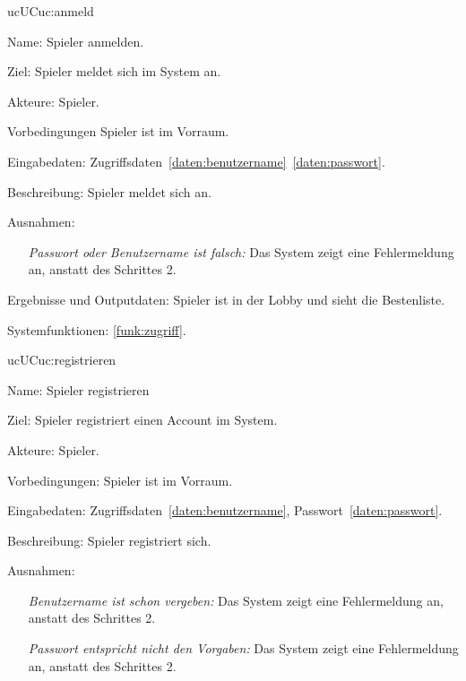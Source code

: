 \begin{description}[leftmargin=5em, style=sameline]
	
	\begin{lhp}{uc}{UC}{uc:anmeld}
		\item [Name:] Spieler anmelden.
		\item [Ziel:] Spieler meldet sich im System an.
		\item [Akteure:] Spieler.
		\item [Vorbedingungen] Spieler ist im Vorraum.
		\item [Eingabedaten:] Zugriffsdaten~\ref{daten:benutzername}~\ref{daten:passwort}.
		\item [Beschreibung:] Spieler meldet sich an.							
		\item [Ausnahmen:] \hfill
			\begin{itemize} 
				\item[] \textit{Passwort oder Benutzername ist falsch:} Das System zeigt eine Fehlermeldung an, anstatt des Schrittes 2.
				
			\end{itemize}
		\item [Ergebnisse und Outputdaten:] Spieler ist in der Lobby und sieht die Bestenliste.	
		\item [Systemfunktionen:] \ref{funk:zugriff}.
	\end{lhp}
	
	\begin{lhp}{uc}{UC}{uc:registrieren}
		\item [Name:] Spieler registrieren
		\item [Ziel:] Spieler registriert einen Account im System.
		\item [Akteure:] Spieler.
		\item [Vorbedingungen:] Spieler ist im Vorraum.
		\item [Eingabedaten:] Zugriffsdaten~\ref{daten:benutzername}, Passwort~\ref{daten:passwort}.
		\item [Beschreibung:] Spieler registriert sich.
		\item [Ausnahmen:] \hfill
			\begin{itemize} 
				\item[] \textit{Benutzername ist schon vergeben:} Das System zeigt eine Fehlermeldung an, anstatt des Schrittes 2.
				
				\item[] \textit{Passwort entspricht nicht den Vorgaben:} Das System zeigt eine Fehlermeldung an, anstatt des Schrittes 2.
				

\end{itemize}
\end{lhp}
\end{description}
